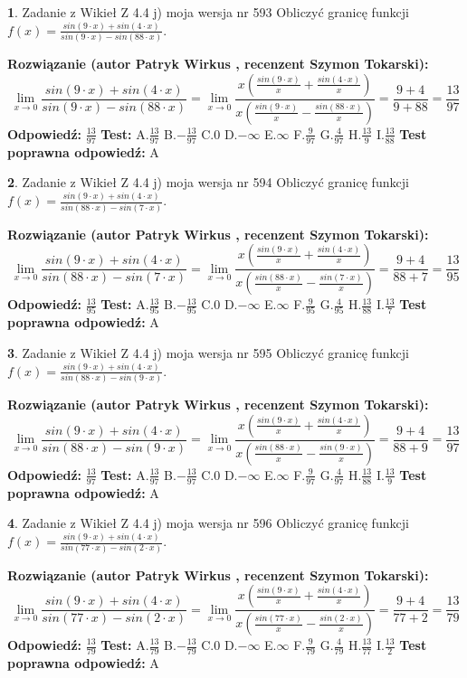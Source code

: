 \documentclass[12pt, a4paper]{article}
\theoremstyle{definition} %
\newtheorem{zad}{}
\newcommand{\zadStart}[1]{\begin{zad}#1\newline}
\newcommand{\zadStop}{\end{zad}}
\newcommand{\rozwStart}[2]{\noindent \textbf{Rozwiązanie (autor #1 , recenzent #2): }\newline}
\newcommand{\rozwStop}{\newline}
\newcommand{\odpStart}{\noindent \textbf{Odpowiedź:}\newline}
\newcommand{\odpStop}{\newline}
\newcommand{\testStart}{\noindent \textbf{Test:}\newline}
\newcommand{\testStop}{\newline}
\newcommand{\kluczStart}{\noindent \textbf{Test poprawna odpowiedź:}\newline}
\newcommand{\kluczStop}{\newline}
\begin{document}
\zadStart{Zadanie z Wikieł Z 4.4 j) moja wersja nr 593}
Obliczyć granicę funkcji $f(x)=\frac{sin(9\cdot x) +sin(4\cdot x)}{sin(9\cdot x) -sin(88\cdot x)}$.
\zadStop
\rozwStart{Patryk Wirkus}{Szymon Tokarski}
$$\lim\limits_{x\to 0}\frac{sin(9\cdot x) +sin(4\cdot x)}{sin(9\cdot x) -sin(88\cdot x)}=\lim\limits_{x\to 0}\frac{x(\frac{sin(9\cdot x)}{x}+\frac{sin(4\cdot x)}{x})}{x(\frac{sin(9\cdot x)}{x}-\frac{sin(88\cdot x)}{x})}=\frac{9+4}{9+88} = \frac{13}{97}$$
\rozwStop
\odpStart
$\frac{13}{97}$
\odpStop
\testStart
A.$\frac{13}{97}$
B.$-\frac{13}{97}$
C.$0$
D.$-\infty$
E.$\infty$
F.$\frac{9}{97}$
G.$\frac{4}{97}$
H.$\frac{13}{9}$
I.$\frac{13}{88}$
\testStop
\kluczStart
A
\kluczStop



\zadStart{Zadanie z Wikieł Z 4.4 j) moja wersja nr 594}
Obliczyć granicę funkcji $f(x)=\frac{sin(9\cdot x) +sin(4\cdot x)}{sin(88\cdot x) -sin(7\cdot x)}$.
\zadStop
\rozwStart{Patryk Wirkus}{Szymon Tokarski}
$$\lim\limits_{x\to 0}\frac{sin(9\cdot x) +sin(4\cdot x)}{sin(88\cdot x) -sin(7\cdot x)}=\lim\limits_{x\to 0}\frac{x(\frac{sin(9\cdot x)}{x}+\frac{sin(4\cdot x)}{x})}{x(\frac{sin(88\cdot x)}{x}-\frac{sin(7\cdot x)}{x})}=\frac{9+4}{88+7} = \frac{13}{95}$$
\rozwStop
\odpStart
$\frac{13}{95}$
\odpStop
\testStart
A.$\frac{13}{95}$
B.$-\frac{13}{95}$
C.$0$
D.$-\infty$
E.$\infty$
F.$\frac{9}{95}$
G.$\frac{4}{95}$
H.$\frac{13}{88}$
I.$\frac{13}{7}$
\testStop
\kluczStart
A
\kluczStop



\zadStart{Zadanie z Wikieł Z 4.4 j) moja wersja nr 595}
Obliczyć granicę funkcji $f(x)=\frac{sin(9\cdot x) +sin(4\cdot x)}{sin(88\cdot x) -sin(9\cdot x)}$.
\zadStop
\rozwStart{Patryk Wirkus}{Szymon Tokarski}
$$\lim\limits_{x\to 0}\frac{sin(9\cdot x) +sin(4\cdot x)}{sin(88\cdot x) -sin(9\cdot x)}=\lim\limits_{x\to 0}\frac{x(\frac{sin(9\cdot x)}{x}+\frac{sin(4\cdot x)}{x})}{x(\frac{sin(88\cdot x)}{x}-\frac{sin(9\cdot x)}{x})}=\frac{9+4}{88+9} = \frac{13}{97}$$
\rozwStop
\odpStart
$\frac{13}{97}$
\odpStop
\testStart
A.$\frac{13}{97}$
B.$-\frac{13}{97}$
C.$0$
D.$-\infty$
E.$\infty$
F.$\frac{9}{97}$
G.$\frac{4}{97}$
H.$\frac{13}{88}$
I.$\frac{13}{9}$
\testStop
\kluczStart
A
\kluczStop



\zadStart{Zadanie z Wikieł Z 4.4 j) moja wersja nr 596}
Obliczyć granicę funkcji $f(x)=\frac{sin(9\cdot x) +sin(4\cdot x)}{sin(77\cdot x) -sin(2\cdot x)}$.
\zadStop
\rozwStart{Patryk Wirkus}{Szymon Tokarski}
$$\lim\limits_{x\to 0}\frac{sin(9\cdot x) +sin(4\cdot x)}{sin(77\cdot x) -sin(2\cdot x)}=\lim\limits_{x\to 0}\frac{x(\frac{sin(9\cdot x)}{x}+\frac{sin(4\cdot x)}{x})}{x(\frac{sin(77\cdot x)}{x}-\frac{sin(2\cdot x)}{x})}=\frac{9+4}{77+2} = \frac{13}{79}$$
\rozwStop
\odpStart
$\frac{13}{79}$
\odpStop
\testStart
A.$\frac{13}{79}$
B.$-\frac{13}{79}$
C.$0$
D.$-\infty$
E.$\infty$
F.$\frac{9}{79}$
G.$\frac{4}{79}$
H.$\frac{13}{77}$
I.$\frac{13}{2}$
\testStop
\kluczStart
A
\kluczStop
\end{document}

